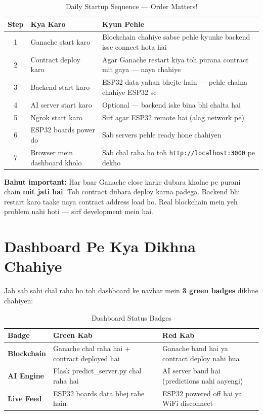 \begin{table}[H]
\centering
\begin{tabularx}{\textwidth}{c l X}
\toprule
\textbf{Step} & \textbf{Kya Karo} & \textbf{Kyun Pehle} \\
\midrule
1 & Ganache start karo & Blockchain chahiye sabse pehle kyunke backend isse connect hota hai \\
2 & Contract deploy karo & Agar Ganache restart kiya toh purana contract mit gaya --- naya chahiye \\
3 & Backend start karo & ESP32 data yahan bhejte hain --- pehle chalna chahiye ESP32 se \\
4 & AI server start karo & Optional --- backend iske bina bhi chalta hai \\
5 & Ngrok start karo & Sirf agar ESP32 remote hai (alag network pe) \\
6 & ESP32 boards power do & Sab servers pehle ready hone chahiyen \\
7 & Browser mein dashboard kholo & Sab chal raha ho toh \texttt{http://localhost:3000} pe dekho \\
\bottomrule
\end{tabularx}
\caption{Daily Startup Sequence --- Order Matters!}
\end{table}

\begin{warnbox}[Ganache Reset = Re-deploy!]
\textbf{Bahut important:} Har baar Ganache close karke dubara kholne pe purani chain \textbf{mit jati hai}. Toh contract dubara deploy karna padega. Backend bhi restart karo taake naya contract address load ho. Real blockchain mein yeh problem nahi hoti --- sirf development mein hai.
\end{warnbox}

\section{Dashboard Pe Kya Dikhna Chahiye}

Jab sab sahi chal raha ho toh dashboard ke navbar mein \textbf{3 green badges} dikhne chahiyen:

\begin{table}[H]
\centering
\begin{tabularx}{\textwidth}{l l X}
\toprule
\textbf{Badge} & \textbf{Green Kab} & \textbf{Red Kab} \\
\midrule
\textbf{Blockchain} & Ganache chal raha hai + contract deployed hai & Ganache band hai ya contract deploy nahi hua \\
\textbf{AI Engine} & Flask predict\_server.py chal raha hai & AI server band hai (predictions nahi aayengi) \\
\textbf{Live Feed} & ESP32 boards data bhej rahe hain & ESP32 powered off hai ya WiFi disconnect \\
\bottomrule
\end{tabularx}
\caption{Dashboard Status Badges}
\end{table}

